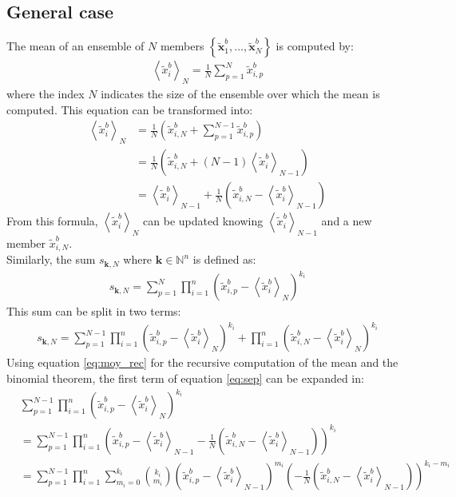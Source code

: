 \documentclass[12pt]{scrartcl}
\begin{document}
\subsection{General case}
The mean of an ensemble of $N$ members $\left\{\widetilde{\mathbf{x}}^b_1,\dots,\widetilde{\mathbf{x}}^b_N\right\}$ is computed by:
\begin{align}
\left\langle \widetilde{x}^b_i \right\rangle_N = \frac{1}{N} \sum_{p=1}^N \widetilde{x}^b_{i,p}
\end{align}
where the index $N$ indicates the size of the ensemble over which the mean is computed. This equation can be transformed into:
\begin{align}
\label{eq:moy_rec}
\left\langle \widetilde{x}^b_i \right\rangle_N & = \frac{1}{N} \left(\widetilde{x}^b_{i,N} + \sum_{p=1}^{N-1} \widetilde{x}^b_{i,p} \right) \nonumber \\
 & = \frac{1}{N} \left(\widetilde{x}^b_{i,N} + (N-1) \left\langle \widetilde{x}^b_i \right\rangle_{N-1} \right) \nonumber \\
 & = \left\langle \widetilde{x}^b_i \right\rangle_{N-1} + \frac{1}{N} \left(\widetilde{x}^b_{i,N} - \left\langle \widetilde{x}^b_i \right\rangle_{N-1}\right)
\end{align}
From this formula, $\left\langle \widetilde{x}^b_i \right\rangle_N$ can be updated knowing $\left\langle \widetilde{x}^b_i \right\rangle_{N-1}$ and a new member $\widetilde{x}^b_{i,N}$.
$  $\\
Similarly, the sum $s_{\mathbf{k},N}$ where $\mathbf{k} \in \mathbb{N}^n$ is defined as:
\begin{align}
s_{\mathbf{k},N} = \sum_{p=1}^N \prod_{i=1}^n \left(\widetilde{x}^b_{i,p} - \left\langle \widetilde{x}^b_i \right\rangle_N\right)^{k_i}
\end{align}
This sum can be split in two terms:
\begin{align}
\label{eq:sep}
s_{\mathbf{k},N} = \sum_{p=1}^{N-1} \prod_{i=1}^n \left(\widetilde{x}^b_{i,p} - \left\langle \widetilde{x}^b_i \right\rangle_N\right)^{k_i}  + \prod_{i=1}^n \left(\widetilde{x}^b_{i,N} - \left\langle \widetilde{x}^b_i \right\rangle_N\right)^{k_i}
\end{align}
Using equation \eqref{eq:moy_rec} for the recursive computation of the mean and the binomial theorem, the first term of equation \eqref{eq:sep} can be expanded in:
\begin{align}
&   \sum_{p=1}^{N-1} \prod_{i=1}^n \left(\widetilde{x}^b_{i,p} - \left\langle \widetilde{x}^b_i \right\rangle_N\right)^{k_i} \nonumber \\
& = \sum_{p=1}^{N-1} \prod_{i=1}^n \left(\widetilde{x}^b_{i,p} - \left\langle \widetilde{x}^b_i \right\rangle_{N-1} - \frac{1}{N} \left(\widetilde{x}^b_{i,N} - \left\langle \widetilde{x}^b_i \right\rangle_{N-1}\right)\right)^{k_i} \nonumber \\
& = \sum_{p=1}^{N-1} \prod_{i=1}^n \sum_{m_i=0}^{k_i} \binom{k_i}{m_i} \left(\widetilde{x}^b_{i,p} - \left\langle \widetilde{x}^b_i \right\rangle_{N-1}\right)^{m_i}\left(-\frac{1}{N} \left(\widetilde{x}^b_{i,N} - \left\langle \widetilde{x}^b_i \right\rangle_{N-1}\right)\right)^{k_i-m_i}
\end{align}
\end{document}
